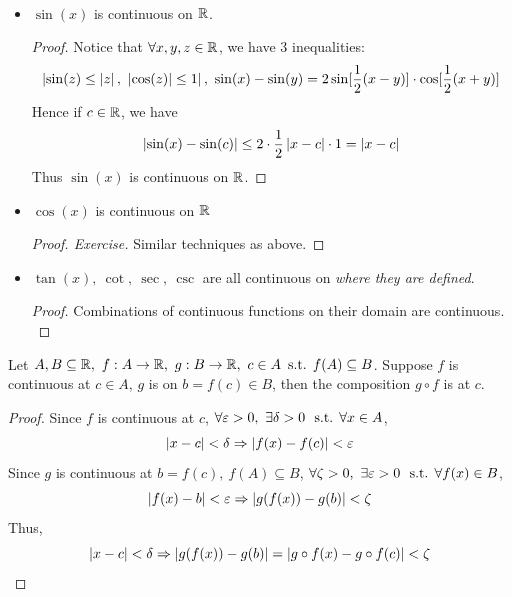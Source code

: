 \documentclass[a4paper,12pt]{article}
\begin{document}
\begin{example}\ 
    \begin{itemize}
        \item \(\sin(x)\) is continuous on \(\mathbb{R}\).
        \begin{proof}
            Notice that \(\forall x, y, z\in \mathbb{R}\), we have 3 inequalities:
            \[\abs{\sin(z)\le \abs{z},\ \abs{\cos(z)}\le 1},\ \sin(x)-\sin(y)=2\sin[\dfrac{1}{2}(x-y)]\cdot \cos[\dfrac{1}{2}(x+y)]\]
            Hence if \(c\in\mathbb{R}\), we have 
            \[\left\lvert \sin(x)-\sin(c)\right\rvert\le 2\cdot \frac{1}{2}\left\lvert x-c\right\rvert\cdot 1=\left\lvert x-c\right\rvert\]
            Thus \(\sin(x)\) is continuous on \(\mathbb{R}\).
        \end{proof}
        \item \(\cos(x)\) is continuous on \(\mathbb{R}\)
        \begin{proof}[Proof. Exercise]
            Similar techniques as above.
        \end{proof}
        \item \(\tan(x),\ \cot,\ \sec,\ \csc\) are all continuous on \textit{where they are defined}.
        \begin{proof}
            Combinations of continuous functions on their domain are continuous.\\
        \end{proof}
    \end{itemize}
\end{example}

\begin{theorem}
    Let \(A,B\subseteq\R,\ f:A\rightarrow\R,\ g:B\rightarrow\R,\ c \in A\, \st f(A)\subseteq B\). Suppose \(f\) is continuous at \(c\in A\), 
    \(g\) is  on \(b=f(c)\in B\), then the composition \(g \circ f\) is \highlight{continuous} at \(c\). 
    
    \begin{proof}
        Since \(f\) is continuous at \(c\), \(\forall \varepsilon>0,\ \exists \delta>0\ \text{ s.t. }\forall x\in A\), 
        \[\left\lvert x-c\right\rvert<\delta\Rightarrow\left\lvert f(x)-f(c)\right\rvert<\varepsilon\]
        Since \(g\) is continuous at \(b=f(c),\ f(A)\subseteq B\), \(\forall \zeta>0,\ \exists \varepsilon>0\ \text{ s.t. }\forall f(x)\in B\), 
        \[\left\lvert f(x)-b\right\rvert<\varepsilon\Rightarrow\left\lvert g(f(x))-g(b)\right\rvert<\zeta\]
        Thus,
        \[\left\lvert x-c\right\rvert<\delta\Rightarrow\left\lvert g(f(x))-g(b)\right\rvert=\left\lvert g\circ f(x)-g\circ f(c)\right\rvert<\zeta\]
    \end{proof}
\end{theorem}
\end{document}

